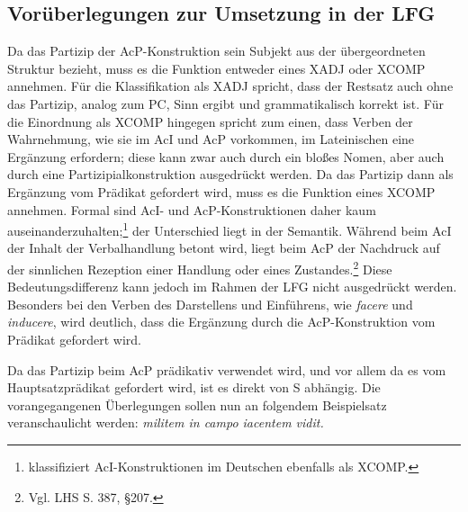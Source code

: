 \documentclass[12pt,a4paper]{article}
\begin{document}



\subsection{Vorüberlegungen zur Umsetzung in der LFG}
Da das Partizip der AcP-Konstruktion sein Subjekt aus der übergeordneten Struktur bezieht, muss es die Funktion entweder eines XADJ oder XCOMP annehmen. Für die Klassifikation als XADJ spricht, dass der Restsatz auch ohne das Partizip, analog zum PC, Sinn ergibt und grammatikalisch korrekt ist. Für die Einordnung als XCOMP hingegen spricht zum einen, dass Verben der Wahrnehmung, wie sie im AcI und AcP vorkommen, im Lateinischen eine Ergänzung erfordern; diese kann zwar auch durch ein bloßes Nomen, aber auch durch eine Partizipialkonstruktion ausgedrückt werden. Da das Partizip dann als Ergänzung vom Prädikat gefordert wird, muss es die Funktion eines XCOMP annehmen. Formal sind AcI- und AcP-Konstruktionen daher kaum auseinanderzuhalten;\footnote{\cite[53]{Skript} klassifiziert AcI-Konstruktionen im Deutschen ebenfalls als XCOMP.} der Unterschied liegt in der Semantik. Während beim AcI der Inhalt der Verbalhandlung betont wird, liegt beim AcP der Nachdruck auf der sinnlichen Rezeption einer Handlung oder eines Zustandes.\footnote{Vgl. LHS S. 387, §207.} Diese Bedeutungsdifferenz kann jedoch im Rahmen der LFG nicht ausgedrückt werden. Besonders bei den Verben des Darstellens und Einführens, wie \textit{facere} und \textit{inducere}, wird deutlich, dass die Ergänzung durch die AcP-Konstruktion vom Prädikat gefordert wird.

Da das Partizip beim AcP prädikativ verwendet wird, und vor allem da es vom Hauptsatzprädikat gefordert wird, ist es direkt von S abhängig. Die vorangegangenen Überlegungen sollen nun an folgendem Beispielsatz veranschaulicht werden: \textit{militem in campo iacentem vidit.}
\end{document}
